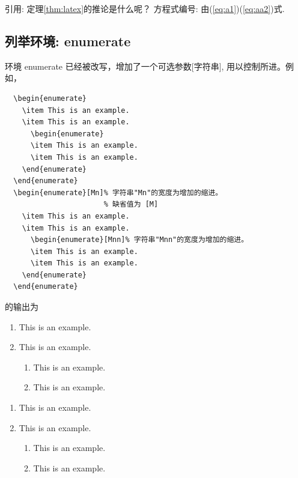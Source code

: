引用:   定理\ref{thm:latex}的推论是什么呢？
方程式编号:  由(\ref{eq:a1})(\ref{eq:aa2})式.

\subsection{列举环境:  enumerate}

环境 enumerate 已经被改写，增加了一个可选参数[字符串], 用以控制所进。例如，
\begin{verbatim}
  \begin{enumerate}
    \item This is an example.
    \item This is an example.
      \begin{enumerate}
      \item This is an example.
      \item This is an example.
    \end{enumerate}
  \end{enumerate}
  \begin{enumerate}[Mn]% 字符串"Mn"的宽度为增加的缩进。
                       % 缺省值为 [M]
    \item This is an example.
    \item This is an example.
      \begin{enumerate}[Mnn]% 字符串"Mnn"的宽度为增加的缩进。
      \item This is an example.
      \item This is an example.
    \end{enumerate}
  \end{enumerate}
\end{verbatim}
的输出为
  \begin{enumerate}
    \item This is an example.
    \item This is an example.
      \begin{enumerate}
      \item This is an example.
      \item This is an example.
    \end{enumerate}
  \end{enumerate}
  \begin{enumerate}[Mn]%
    \item This is an example.
    \item This is an example.
      \begin{enumerate}[Mnn]%
      \item This is an example.
      \item This is an example.
    \end{enumerate}
  \end{enumerate}

